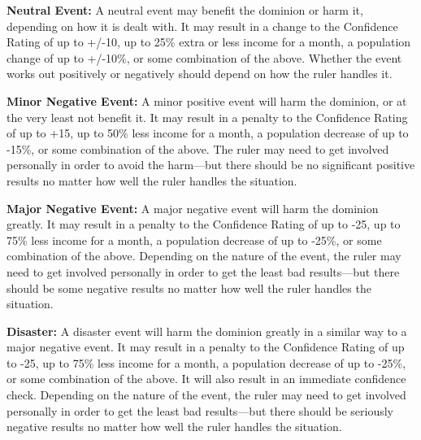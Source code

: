 \begin{multicols*}{2}
\textbf{Neutral Event:} A neutral event may benefit the dominion or harm it, depending on how it is dealt with. It may result in a change to the Confidence Rating of up to +/-10, up to 25\% extra or less income for a month, a population change of up to +/-10\%, or some combination of the above. Whether the event works out positively or negatively should depend on how the ruler handles it.


\textbf{Minor Negative Event:} A minor positive event will harm the dominion, or at the very least not benefit it. It may result in a penalty to the Confidence Rating of up to +15, up to 50\% less income for a month, a population decrease of up to -15\%, or some combination of the above. The ruler may need to get involved personally in order to avoid the harm—but there should be no significant positive results no matter how well the ruler handles the situation.


\textbf{Major Negative Event:} A major negative event will harm the dominion greatly. It may result in a penalty to the Confidence Rating of up to -25, up to 75\% less income for a month, a population decrease of up to -25\%, or some combination of the above. Depending on the nature of the event, the ruler may need to get involved personally in order to get the least bad results—but there should be some negative results no matter how well the ruler handles the situation.


\textbf{Disaster:} A disaster event will harm the dominion greatly in a similar way to a major negative event. It may result in a penalty to the Confidence Rating of up to -25, up to 75\% less income for a month, a population decrease of up to -25\%, or some combination of the above. It will also result in an immediate confidence check. Depending on the nature of the event, the ruler may need to get involved personally in order to get the least bad results—but there should be seriously negative results no matter how well the ruler handles the situation.


\end{multicols*}

